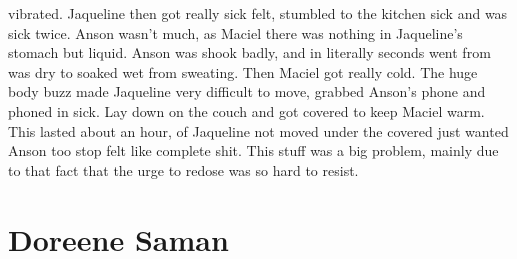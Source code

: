 \documentclass[12pt]{book}
\begin{document}
vibrated. Jaqueline then got really sick felt, stumbled to the kitchen sick and was sick twice. Anson wasn't much, as Maciel there was nothing in Jaqueline's stomach but liquid. Anson was shook badly, and in literally seconds went from was dry to soaked wet from sweating. Then Maciel got really cold. The huge body buzz made Jaqueline very difficult to move, grabbed Anson's phone and phoned in sick. Lay down on the couch and got covered to keep Maciel warm. This lasted about an hour, of Jaqueline not moved under the covered just wanted Anson too stop felt like complete shit. This stuff was a big problem, mainly due to that fact that the urge to redose was so hard to resist.



\chapter{Doreene Saman}
\end{document}
